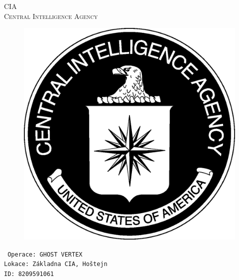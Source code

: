 \documentclass[a4paper, \fontheight]{article}
\begin{document}
	\begin{titlepage}
		\begin{center}		
			\textsc{{\fontsize{80}{0}\selectfont CIA}\\[2em]
				\Huge Central Intelligence Agency\\[2.5em]}
				
			\begin{figure}[H]
				\centering
				\includegraphics[scale=0.6]{sources/CIA_logo.eps}
			\end{figure}
		\end{center}	
		\vfill
		\noindent
		\texttt{\LARGE
				Operace: GHOST VERTEX\\[0.4em]
				Lokace: Základna CIA, Hoštejn\\[0.4em]
				ID: 8209591061}	
\end{titlepage} 
\end{document}
